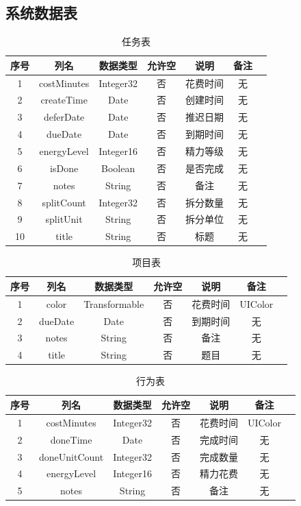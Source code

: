 \subsection{系统数据表}

\begin{table}[H]
  \centering
  \caption{任务表}
  \begin{tabular}{ccccccc} \toprule
	序号 & 列名 & 数据类型 & 允许空 & 说明 & 备注 \\
	\midrule
	1 & costMinutes & Integer32 & 否 & 花费时间 & 无 \\
	2 & createTime & Date & 否 & 创建时间 & 无 \\
	3 & deferDate & Date & 否 & 推迟日期 & 无 \\
	4 & dueDate & Date & 否 & 到期时间 & 无 \\
	5 & energyLevel & Integer16 & 否 & 精力等级 & 无 \\
	6 & isDone & Boolean & 否 & 是否完成 & 无 \\
	7 & notes & String & 否 & 备注 & 无 \\
	8 & splitCount & Integer32 & 否 & 拆分数量 & 无 \\
	9 & splitUnit & String & 否 & 拆分单位 & 无 \\
	10 & title & String & 否 & 标题 & 无 \\
	\bottomrule
  \end{tabular}
\end{table}

\begin{table}[H]
	\centering
	\caption{项目表}
	\begin{tabular}{ccccccc} \toprule
	  序号 & 列名 & 数据类型 & 允许空 & 说明 & 备注 \\
	  \midrule
	  1 & color & Transformable & 否 & 花费时间 & UIColor \\
	  2 & dueDate & Date & 否 & 到期时间 & 无 \\
	  3 & notes & String & 否 & 备注 & 无 \\
	  4 & title & String & 否 & 题目 & 无 \\
	  \bottomrule
	\end{tabular}
\end{table}

\begin{table}[H]
	\centering
	\caption{行为表}
	\begin{tabular}{ccccccc} \toprule
	  序号 & 列名 & 数据类型 & 允许空 & 说明 & 备注 \\
	  \midrule
	  1 & costMinutes & Integer32 & 否 & 花费时间 & UIColor \\
	  2 & doneTime & Date & 否 & 完成时间 & 无 \\
	  3 & doneUnitCount & Integer32 & 否 & 完成数量 & 无 \\
	  4 & energyLevel & Integer16 & 否 & 精力花费 & 无 \\
	  5 & notes & String & 否 & 备注 & 无 \\
	  \bottomrule
	\end{tabular}
\end{table}


